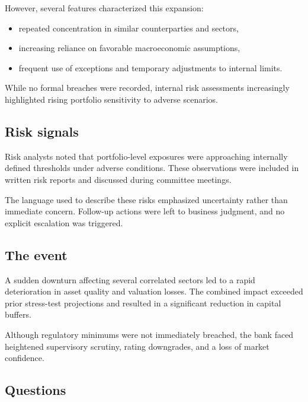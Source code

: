 \documentclass[11pt]{article}
\begin{document}
However, several features characterized this expansion:
\begin{itemize}
    \item[$\bullet$] repeated concentration in similar counterparties and sectors,
    \item[$\bullet$] increasing reliance on favorable macroeconomic assumptions,
    \item[$\bullet$] frequent use of exceptions and temporary adjustments to
    internal limits.
\end{itemize}

While no formal breaches were recorded, internal risk assessments increasingly
highlighted rising portfolio sensitivity to adverse scenarios.

\subsection*{Risk signals}

Risk analysts noted that portfolio-level exposures were approaching internally
defined thresholds under adverse conditions. These observations were included
in written risk reports and discussed during committee meetings.

The language used to describe these risks emphasized uncertainty rather than
immediate concern. Follow-up actions were left to business judgment, and no
explicit escalation was triggered.

\subsection*{The event}

A sudden downturn affecting several correlated sectors led to a rapid
deterioration in asset quality and valuation losses. The combined impact
exceeded prior stress-test projections and resulted in a significant reduction
in capital buffers.

Although regulatory minimums were not immediately breached, the bank faced
heightened supervisory scrutiny, rating downgrades, and a loss of market
confidence.

\subsection*{Questions}
\end{document}

